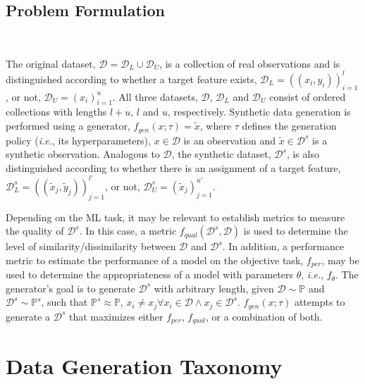 \documentclass[parskip=full]{scrartcl}
\begin{document}

\subsection{Problem Formulation}~\label{sec:problem-formulation}

The original dataset, $\mathcal{D} = \mathcal{D}_L \cup \mathcal{D}_U$,
is a collection of real observations and is distinguished according to whether
a target feature exists, $\mathcal{D}_L = {((x_i, y_i))}^l_{i=1}$, or not,
$\mathcal{D}_U = {(x_i)}^{u}_{i=1}$. All three datasets, $\mathcal{D}$,
$\mathcal{D}_L$ and $\mathcal{D}_U$ consist of ordered collections with
lengths $l+u$, $l$ and $u$, respectively. Synthetic data generation is
performed using a generator, $f_{gen}(x;\tau) = \tilde{x}$, where $\tau$
defines the generation policy (\textit{i.e.}, its hyperparameters), $x \in
\mathcal{D}$ is an observation and $\tilde{x} \in \mathcal{D}^s$ is a
synthetic observation. Analogous to $\mathcal{D}$, the synthetic dataset,
$\mathcal{D}^s$, is also distinguished according to whether there is an
assignment of a target feature, $\mathcal{D}^s_L = {((\tilde{x}_j,
\tilde{y}_j))}^{l'}_{j=1}$, or not, $\mathcal{D}^s_U =
{(\tilde{x}_j)}^{u'}_{j=1}$.

Depending on the ML task, it may be relevant to establish metrics to measure
the quality of $\mathcal{D}^s$. In this case, a metric
$f_{qual}(\mathcal{D}^s, \mathcal{D})$ is used to determine the level of
similarity/dissimilarity between $\mathcal{D}$ and $\mathcal{D}^s$. In
addition, a performance metric to estimate the performance of a model on the
objective task, $f_{per}$, may be used to determine the appropriateness of a
model with parameters $\theta$, \textit{i.e.}, $f_{\theta}$. The generator's
goal is to generate $\mathcal{D}^s$ with arbitrary length, given
$\mathcal{D} \sim \mathbb{P}$ and $\mathcal{D}^s \sim \mathbb{P}^s$, such
that $\mathbb{P}^s \approx \mathbb{P}$, $x_i \neq x_j \forall x_i \in
\mathcal{D} \wedge x_j \in \mathcal{D}^s$. $f_{gen}(x;\tau)$ attempts to
generate a $\mathcal{D}^s$ that maximizes either $f_{per}$, $f_{qual}$, or a
combination of both.


\section{Data Generation Taxonomy}~\label{sec:taxonomy}
\end{document}
